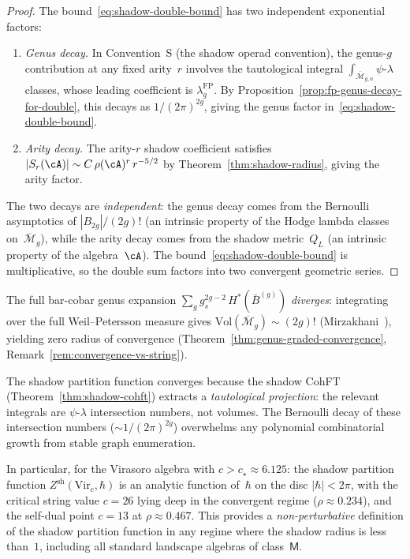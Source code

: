 \begin{proof}
The bound~\eqref{eq:shadow-double-bound} has two independent
exponential factors:
\begin{enumerate}[label=\textup{(\roman*)}]
\item \emph{Genus decay.}
  In Convention~S (the shadow operad convention), the genus-$g$
  contribution at any fixed arity~$r$ involves the tautological
  integral $\int_{\overline{\mathcal{M}}_{g,n}} \psi\text{-}\lambda$
  classes, whose leading coefficient is $\lambda_g^{\mathrm{FP}}$.
  By Proposition~\ref{prop:fp-genus-decay-for-double}, this decays as
  $1/(2\pi)^{2g}$, giving the genus factor in~\eqref{eq:shadow-double-bound}.

\item \emph{Arity decay.}
  The arity-$r$ shadow coefficient satisfies
  $|S_r(\cA)| \sim C\,\rho(\cA)^r\,r^{-5/2}$
  by Theorem~\ref{thm:shadow-radius}, giving the arity factor.
\end{enumerate}
The two decays are \emph{independent}: the genus decay comes
from the Bernoulli asymptotics of $|B_{2g}|/(2g)!$ (an intrinsic
property of the Hodge lambda classes on~$\overline{\mathcal{M}}_g$),
while the arity decay comes from the shadow metric~$Q_L$
(an intrinsic property of the algebra~$\cA$).
The bound~\eqref{eq:shadow-double-bound} is multiplicative,
so the double sum factors into two convergent geometric series.
\end{proof}

\begin{remark}
\label{rem:shadow-vs-string-double-convergence}
The full bar-cobar genus expansion
$\sum_g g_s^{2g-2}\,H^*(\bar{B}^{(g)})$
\emph{diverges}: integrating over the full Weil--Petersson measure
gives $\mathrm{Vol}(\overline{\mathcal{M}}_g) \sim (2g)!$
(Mirzakhani~\cite{Mirzakhani}), yielding zero radius of convergence
(Theorem~\ref{thm:genus-graded-convergence},
Remark~\ref{rem:convergence-vs-string}).

The shadow partition function converges because the shadow CohFT
(Theorem~\ref{thm:shadow-cohft}) extracts a \emph{tautological projection}:
the relevant integrals are $\psi$-$\lambda$ intersection numbers,
not volumes.  The Bernoulli decay of these intersection numbers
($\sim 1/(2\pi)^{2g}$) overwhelms any polynomial combinatorial
growth from stable graph enumeration.

In particular, for the Virasoro algebra with $c > c_\star \approx 6.125$:
the shadow partition function $Z^{\mathrm{sh}}(\mathrm{Vir}_c, \hbar)$
is an analytic function of~$\hbar$ on the disc $|\hbar| < 2\pi$,
with the critical string value $c = 26$ lying deep in the
convergent regime ($\rho \approx 0.234$), and the self-dual point
$c = 13$ at $\rho \approx 0.467$.
This provides a \emph{non-perturbative}
definition of the shadow partition function in any regime where the
shadow radius is less than~$1$, including all standard landscape
algebras of class~$\mathsf{M}$.
\end{remark}


